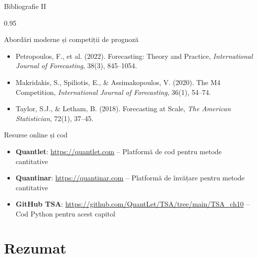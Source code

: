 \documentclass[9pt, aspectratio=169, t]{beamer}
\begin{document}
\begin{frame}{Bibliografie II}
    \begin{cminipage}{0.95\textwidth}
        \begin{block}{Abordări moderne și competiții de prognoză}
            {\small
            \begin{itemize}\setlength{\itemsep}{0pt}
                \item Petropoulos, F., et al. (2022). Forecasting: Theory and Practice, \textit{International Journal of Forecasting}, 38(3), 845--1054.
                \item Makridakis, S., Spiliotis, E., \& Assimakopoulos, V. (2020). The M4 Competition, \textit{International Journal of Forecasting}, 36(1), 54--74.
                \item Taylor, S.J., \& Letham, B. (2018). Forecasting at Scale, \textit{The American Statistician}, 72(1), 37--45.
            \end{itemize}
            }
        \end{block}

        \begin{exampleblock}{Resurse online și cod}
            {\small
            \begin{itemize}\setlength{\itemsep}{0pt}
                \item \textbf{Quantlet}: \url{https://quantlet.com} -- Platformă de cod pentru metode cantitative
                \item \textbf{Quantinar}: \url{https://quantinar.com} -- Platformă de învățare pentru metode cantitative
                \item \textbf{GitHub TSA}: \url{https://github.com/QuantLet/TSA/tree/main/TSA_ch10} -- Cod Python pentru acest capitol
            \end{itemize}
            }
        \end{exampleblock}
    \end{cminipage}
\end{frame}

\section{Rezumat}
\end{document}
